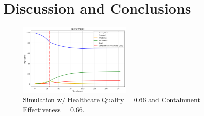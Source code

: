 \documentclass[%
 reprint,
superscriptaddress,
 amsmath,amssymb,
 aps,
floatfix,
]{revtex4-2}
\begin{document}
\section{Discussion and Conclusions}
\begin{figure}
    \centering
    \includegraphics[width=0.5\textwidth]{bestcombo.png}
    \caption{Simulation w/ Healthcare Quality = 0.66 and Containment Effectiveness = 0.66.}
    \label{Best Combo}
\end{figure}
\end{document}
